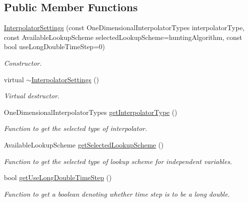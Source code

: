 \subsection*{Public Member Functions}
\begin{DoxyCompactItemize}
\item 
\hyperlink{classtudat_1_1interpolators_1_1InterpolatorSettings_a71512d63540bb770739b9be0e85980b4}{Interpolator\+Settings} (const One\+Dimensional\+Interpolator\+Types interpolator\+Type, const Available\+Lookup\+Scheme selected\+Lookup\+Scheme=hunting\+Algorithm, const bool use\+Long\+Double\+Time\+Step=0)
\begin{DoxyCompactList}\small\item\em Constructor. \end{DoxyCompactList}\item 
virtual \hyperlink{classtudat_1_1interpolators_1_1InterpolatorSettings_ae32f4577b9bb2256efe74b57d8d7bad7}{$\sim$\+Interpolator\+Settings} ()\hypertarget{classtudat_1_1interpolators_1_1InterpolatorSettings_ae32f4577b9bb2256efe74b57d8d7bad7}{}\label{classtudat_1_1interpolators_1_1InterpolatorSettings_ae32f4577b9bb2256efe74b57d8d7bad7}

\begin{DoxyCompactList}\small\item\em Virtual destructor. \end{DoxyCompactList}\item 
One\+Dimensional\+Interpolator\+Types \hyperlink{classtudat_1_1interpolators_1_1InterpolatorSettings_a16ceb8f2f1f002b46c9d0bec96495bdf}{get\+Interpolator\+Type} ()
\begin{DoxyCompactList}\small\item\em Function to get the selected type of interpolator. \end{DoxyCompactList}\item 
Available\+Lookup\+Scheme \hyperlink{classtudat_1_1interpolators_1_1InterpolatorSettings_a92883f0636896ae9a1a366bb81399556}{get\+Selected\+Lookup\+Scheme} ()
\begin{DoxyCompactList}\small\item\em Function to get the selected type of lookup scheme for independent variables. \end{DoxyCompactList}\item 
bool \hyperlink{classtudat_1_1interpolators_1_1InterpolatorSettings_adab7eabdb0659b3be137cf9eb44c0145}{get\+Use\+Long\+Double\+Time\+Step} ()
\begin{DoxyCompactList}\small\item\em Function to get a boolean denoting whether time step is to be a long double. \end{DoxyCompactList}\end{DoxyCompactItemize}
